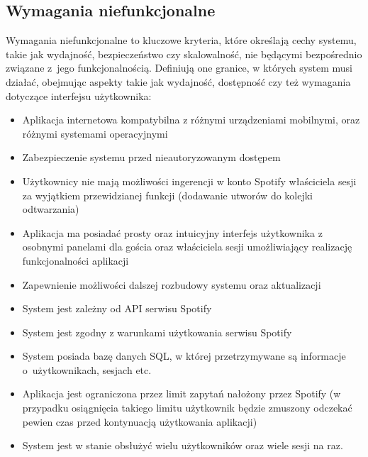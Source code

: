 \subsection{Wymagania niefunkcjonalne}
Wymagania niefunkcjonalne to kluczowe kryteria, które określają cechy systemu, takie jak wydajność, bezpieczeństwo czy skalowalność, nie będącymi bezpośrednio związane z~jego funkcjonalnością. Definiują one granice, w których system musi działać, obejmując aspekty takie jak wydajność, dostępność czy też wymagania dotyczące interfejsu użytkownika:
\begin{itemize}
	\item Aplikacja internetowa kompatybilna z różnymi urządzeniami mobilnymi, oraz różnymi systemami operacyjnymi
	\item Zabezpieczenie systemu przed nieautoryzowanym dostępem
	\item Użytkownicy nie mają możliwości ingerencji w konto Spotify właściciela sesji za wyjątkiem przewidzianej funkcji (dodawanie utworów do kolejki odtwarzania)
	\item Aplikacja ma posiadać prosty oraz intuicyjny interfejs użytkownika z osobnymi panelami dla gościa oraz właściciela sesji umożliwiający realizację funkcjonalności aplikacji
	\item Zapewnienie możliwości dalszej rozbudowy systemu oraz aktualizacji
	\item System jest zależny od API serwisu Spotify
	\item System jest zgodny z warunkami użytkowania serwisu Spotify \cite{bib:spotify_terms}
	\item System posiada bazę danych SQL, w której przetrzymywane są informacje o~użytkownikach, sesjach etc. 
	\item Aplikacja jest ograniczona przez limit zapytań nałożony przez Spotify (w przypadku osiągnięcia takiego limitu użytkownik będzie zmuszony odczekać pewien czas przed kontynuacją użytkowania aplikacji)
	\item System jest w stanie obsłużyć wielu użytkowników oraz wiele sesji na raz.
\end{itemize}

